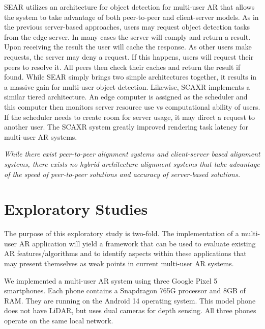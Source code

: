 \documentclass{vgtc}                          %
\begin{document}
SEAR \cite{SEAR} utilizes an architecture for object detection for multi-user AR that allows the system to take advantage of 
both peer-to-peer and client-server models. As in the previous server-based approaches, users may request object detection tasks 
from the edge server. In many cases the server will comply and return a result. Upon receiving the result the user 
will cache the response. As other users make requests, the server may deny a request. If this happens, users will request 
their peers to resolve it. All peers then check their caches and return the result if found. While SEAR simply brings 
two simple architectures together, it results in a massive gain for multi-user object detection. Likewise, SCAXR \cite{SCAXR}
implements a similar tiered architecture. An edge computer is assigned as the scheduler and this computer then monitors 
server resource use vs computational ability of users. If the scheduler needs to create room for server usage, it may direct a 
request to another user. The SCAXR system greatly improved rendering task latency for multi-user AR systems. 




{\it While there exist peer-to-peer alignment systems and client-server based alignment systems, there exists no hybrid architecture 
alignment systems that take advantage of the speed of peer-to-peer solutions and accuracy of server-based solutions.}

\section{Exploratory Studies}
The purpose of this exploratory study is two-fold. The implementation of a multi-user AR application will yield a 
framework that can be used to evaluate existing AR features/algorithms and to identify aspects within these 
applications that may present themselves as weak points in current multi-user AR systems.

We implemented a multi-user AR system using three Google 
Pixel 5 smartphones. Each phone contains a Snapdragon 765G processor and 8GB of RAM. They are running on the Android 14 operating 
system. This model phone does not have LiDAR, but uses dual cameras for depth sensing. All three phones operate on the same local network.
\end{document}
